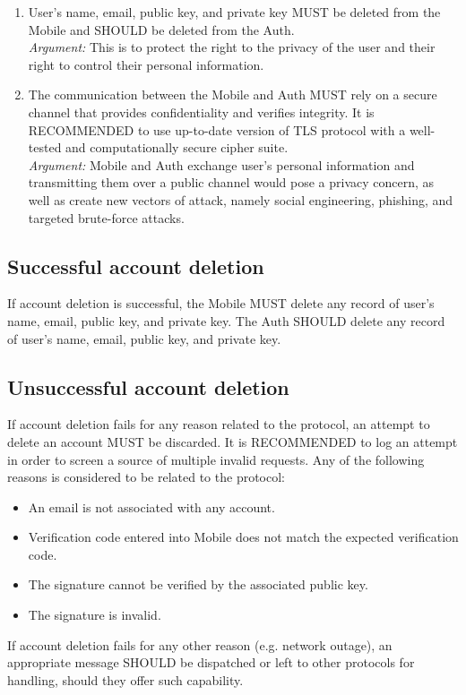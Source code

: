 \begin{enumerate}
                \item User's name, email, public key, and private key MUST be deleted from the Mobile and SHOULD be 
                      deleted from the Auth.\\        
                \textit{Argument:} This is to protect the right to the privacy of the user and their right to control 
                                   their personal information.
    
                \item The communication between the Mobile and Auth MUST rely on a secure channel that provides 
                      confidentiality and verifies integrity. It is RECOMMENDED to use up-to-date version of 
                      TLS protocol with a well-tested and computationally secure cipher suite.\\      
                \textit{Argument:} Mobile and Auth exchange user's personal information and transmitting them over a 
                                   public channel would pose a privacy concern, as well as create new vectors of attack, 
                                   namely social engineering, phishing, and targeted brute-force attacks.
        \end{enumerate}
    
    \subsection{Successful account deletion}
    If account deletion is successful, the Mobile MUST delete any record of user's name, email, public key, and 
    private key. The Auth SHOULD delete any record of user's name, email, public key, and private key.

    \subsection{Unsuccessful account deletion}
    If account deletion fails for any reason related to the protocol, an attempt to delete an account MUST be discarded. 
    It is RECOMMENDED to log an attempt in order to screen a source of multiple invalid requests. Any of the following 
    reasons is considered to be related to the protocol:
        \begin{itemize}
            \item An email is not associated with any account.
            \item Verification code entered into Mobile does not match the expected verification code.
            \item The signature cannot be verified by the associated public key.
            \item The signature is invalid.
        \end{itemize}
    If account deletion fails for any other reason (e.g. network outage), an appropriate message SHOULD be dispatched or 
    left to other protocols for handling, should they offer such capability.
